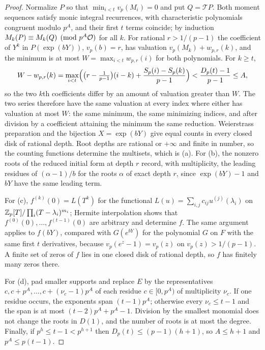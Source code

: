 \begin{proof}
Normalize $P$ so that $\min_{i<t}v_p(M_i)=0$ and put $Q=\mathcal TP$. Both moment sequences
satisfy monic integral recurrences, with characteristic polynomials congruent modulo $p^A$, and
their first $t$ terms coincide; by induction $M_k(P)\equiv M_k(Q)\pmod{p^A\mathcal{O}}$ for all $k$.
For rational $r>1/(p-1)$ the coefficient of $Y^k$ in $P(\exp(bY))$, $v_p(b)=r$, has valuation
$v_p(M_k)+w_{p,r}(k)$, and the minimum is at most $W=\max_{i<t}w_{p,r}(i)$ for both
polynomials. For $k\ge t$,
\[
 W-w_{p,r}(k)=\max_{i<t}\Bigl(\bigl(r-\tfrac1{p-1}\bigr)(i-k)+\frac{S_p(i)-S_p(k)}{p-1}\Bigr)
 <\frac{D_p(t)-1}{p-1}\le A ,
\]
so the two $k$th coefficients differ by an amount of valuation greater than $W$. The two series
therefore have the same valuation at every index where either has valuation at most $W$: the
same minimum, the same minimizing indices, and after division by a coefficient attaining the
minimum the same reduction. Weierstrass preparation and the bijection $X=\exp(bY)$ give equal
counts in every closed disk of rational depth. Root depths are rational or $+\infty$ and finite
in number, so the counting functions determine the multisets, which is (a). For (b), the nonzero
roots of the reduced initial form at depth $r$ record, with multiplicity, the leading residues of
$(\alpha-1)/b$ for the roots $\alpha$ of exact depth $r$, since $\exp(bY)-1$ and $bY$ have the
same leading term.

For (c), $f^{(k)}(0)=L(T^k)$ for the functional $L(u)=\sum_{i,j}c_{ij}u^{(j)}(\lambda_i)$ on
$\mathbb{Z}_p[T]/\prod_i(T-\lambda_i)^{m_i}$; Hermite interpolation shows that $f^{(0)}(0),\dots,
f^{(t-1)}(0)$ are arbitrary and determine $f$. The same argument applies to $f(bY)$, compared
with $G(e^{bY})$ for the polynomial $G$ on $F$ with the same first $t$ derivatives, because
$v_p(e^z-1)=v_p(z)$ on $v_p(z)>1/(p-1)$. A finite set of zeros of $f$ lies in one closed disk of
rational depth, so $f$ has finitely many zeros there.

For (d), pad smaller supports and replace $E$ by the representatives
$c,c+p^A,\dots,c+(\nu_c-1)p^A$ of each residue $c\in[0,p^A)$ of multiplicity $\nu_c$. If one
residue occurs, the exponents span $(t-1)p^A$; otherwise every $\nu_c\le t-1$ and the span is at
most $(t-2)p^A+p^A-1$. Division by the smallest monomial does not change the roots in $D(1)$, and
the number of roots is at most the degree. Finally, if $p^h\le t-1<p^{h+1}$ then
$D_p(t)\le(p-1)(h+1)$, so $A\le h+1$ and $p^A\le p(t-1)$.
\end{proof}

